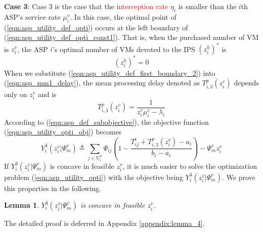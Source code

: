 \documentclass[10pt,journal, compsoc]{IEEEtran}
\newtheorem{lemma}{Lemma}
\begin{document}
\textbf{Case 3}: Case 3 is the case that the \textcolor{red}{interception rate} $\eta_i$ is smaller than the $i$th ASP's service rate $\mu_i^v$. In this case, the optimal point of (\ref{eqn:asp_utility_def_opti}) occurs at the left boundary of (\ref{eqn:asp_utility_def_opti_const1}). That is, when the purchased number of VM is $z_i^v$, the ASP $i$'s optimal number of VMs devoted to the IPS $(z_i^h)^*$ is
\begin{equation} \label{eqn:asp_utility_def_first_boundary_2}
(z_i^h)^* = 0
\end{equation}
When we substitute (\ref{eqn:asp_utility_def_first_boundary_2}) into (\ref{eqn:asp_mm1_delay}), the mean processing delay denoted as $T_{i,3}^p(z_i^v)$ depends only on $z_i^v$ and is
\begin{equation}\label{eqn:asp_case3_mm1_delay}
T_{i,3}^p(z_i^v) = \frac{1}{z_i^v \mu_i^v-\lambda_i}
\end{equation}
According to %
(\ref{eqn:asp_def_subobjective}), the objective function (\ref{eqn:asp_utility_opti_obj}) becomes
\begin{equation}\label{eqn:asp_case3_objective}
Y_i^3(z_i^v|\Psi_m^v) \triangleq \sum_{j \in \mathrm{U}_i^n}\Psi_{ij}(1-\frac{T_{ij}^t + T_{i,3}^p(z_i^v)-a_i}{b_i-a_i}) - \Psi_m^vz_i^v
\end{equation}
If $Y_i^3(z_i^v|\Psi_m^v)$ is concave in feasible $z_i^v$, it is much easier to solve the optimization problem (\ref{eqn:asp_utility_opti}) with the objective being $Y_i^3(z_i^v|\Psi_m^v)$. We prove this properties in the following.
\begin{lemma} \label{lemma:asp_case3_utility_concave}
$Y_i^3(z_i^v|\Psi_m^v)$ is concave in feasible $z_i^v$.
\end{lemma}
The detailed proof is deferred in Appendix \ref{appendix:lemma_4}.
\end{document}
